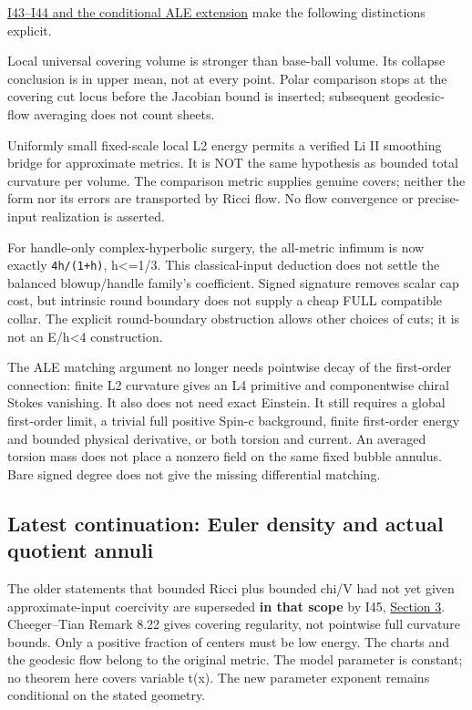 \documentclass[
  10pt,
]{article}
\begin{document}
\href{../continuation/20260927_covering_geometry_and_sharp_subfamilies.md}{I43--I44
and the conditional ALE extension} make the following distinctions
explicit.

Local universal covering volume is stronger than base-ball volume. Its
collapse conclusion is in upper mean, not at every point. Polar
comparison stops at the covering cut locus before the Jacobian bound is
inserted; subsequent geodesic-flow averaging does not count sheets.

Uniformly small fixed-scale local L2 energy permits a verified Li II
smoothing bridge for approximate metrics. It is NOT the same hypothesis
as bounded total curvature per volume. The comparison metric supplies
genuine covers; neither the form nor its errors are transported by Ricci
flow. No flow convergence or precise-input realization is asserted.

For handle-only complex-hyperbolic surgery, the all-metric infimum is
now exactly \texttt{4h/(1+h)}, h\textless=1/3. This classical-input
deduction does not settle the balanced blowup/handle family's
coefficient. Signed signature removes scalar cap cost, but intrinsic
round boundary does not supply a cheap FULL compatible collar. The
explicit round-boundary obstruction allows other choices of cuts; it is
not an E/h\textless4 construction.

The ALE matching argument no longer needs pointwise decay of the
first-order connection: finite L2 curvature gives an L4 primitive and
componentwise chiral Stokes vanishing. It also does not need exact
Einstein. It still requires a global first-order limit, a trivial full
positive Spin-c background, finite first-order energy and bounded
physical derivative, or both torsion and current. An averaged torsion
mass does not place a nonzero field on the same fixed bubble annulus.
Bare signed degree does not give the missing differential matching.

\hypertarget{latest-continuation-euler-density-and-actual-quotient-annuli}{%
\subsection{Latest continuation: Euler density and actual quotient
annuli}\label{latest-continuation-euler-density-and-actual-quotient-annuli}}

The older statements that bounded Ricci plus bounded chi/V had not yet
given approximate-input coercivity are superseded \textbf{in that scope}
by I45,
\href{../continuation/20260927_local_geometry_and_variational_extrema.md}{Section
3}. Cheeger--Tian Remark 8.22 gives covering regularity, not pointwise
full curvature bounds. Only a positive fraction of centers must be low
energy. The charts and the geodesic flow belong to the original metric.
The model parameter is constant; no theorem here covers variable t(x).
The new parameter exponent remains conditional on the stated geometry.
\end{document}
